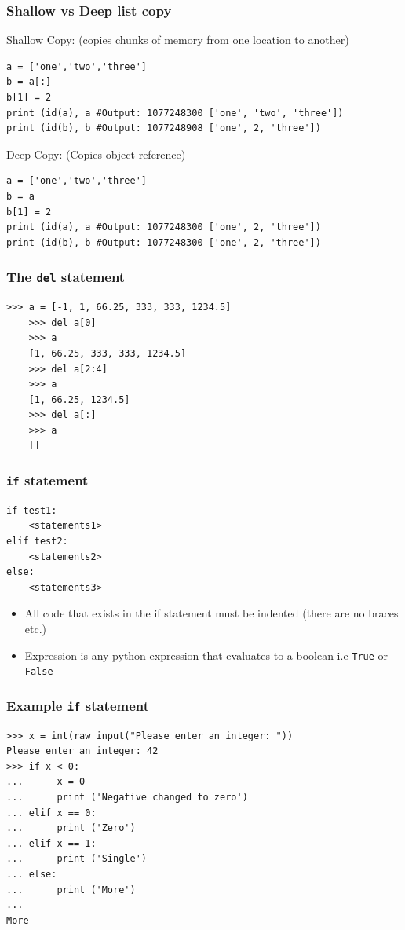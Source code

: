 \documentclass{beamer}
\begin{document}
\begin{frame}[containsverbatim]
\frametitle{Shallow vs Deep list copy}
Shallow Copy: (copies chunks of memory from one location to another)
\begin{lstlisting}
a = ['one','two','three']
b = a[:]
b[1] = 2
print (id(a), a #Output: 1077248300 ['one', 'two', 'three'])
print (id(b), b #Output: 1077248908 ['one', 2, 'three'])
\end{lstlisting}
Deep Copy: (Copies object reference)
\begin{lstlisting}
a = ['one','two','three']
b = a
b[1] = 2
print (id(a), a #Output: 1077248300 ['one', 2, 'three'])
print (id(b), b #Output: 1077248300 ['one', 2, 'three'])
\end{lstlisting}
\end{frame}

\begin{frame}[containsverbatim]
\frametitle{The \texttt{del} statement}
\begin{lstlisting}
>>> a = [-1, 1, 66.25, 333, 333, 1234.5]
    >>> del a[0]
    >>> a
    [1, 66.25, 333, 333, 1234.5]
    >>> del a[2:4]
    >>> a
    [1, 66.25, 1234.5]
    >>> del a[:]
    >>> a
    []
\end{lstlisting}
\end{frame}

\begin{frame}[containsverbatim]
\frametitle{\texttt{if} statement}
\begin{lstlisting}
if test1:
	<statements1>
elif test2:
	<statements2>
else:
	<statements3>
\end{lstlisting}
\begin{itemize}
\item All code that exists in the if statement must be indented (there are no braces etc.)
\item Expression is any python expression that evaluates to a boolean i.e \texttt{True} or \texttt{False}
\end{itemize}
\end{frame}

\begin{frame}[containsverbatim]
\frametitle{Example \texttt{if} statement}
\begin{lstlisting}
>>> x = int(raw_input("Please enter an integer: "))
Please enter an integer: 42
>>> if x < 0:
...      x = 0
...      print ('Negative changed to zero')
... elif x == 0:
...      print ('Zero')
... elif x == 1:
...      print ('Single')
... else:
...      print ('More')
...
More
\end{lstlisting}
\end{frame}
\end{document}
